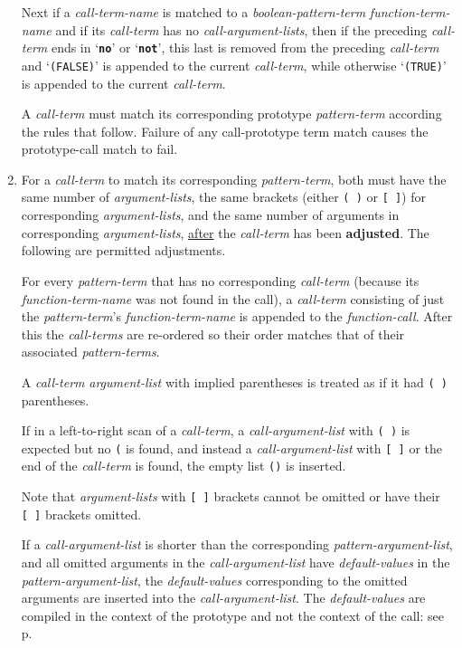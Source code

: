 \documentclass[12pt]{article}
\newcommand{\TT}[1]{{\tt \bfseries #1}}
\newcommand{\key}[1]{{\rm \bfseries #1}}
\newcommand{\pagref}[1]{p\pageref{#1}}
\begin{document}
\begin{enumerate}
Next if a {\em call-term-name} is matched to a {\em boolean-pattern-term}
{\em function-term-name} and if its {\em call-term} has no
{\em call-argument-lists}, then if the preceding {\em call-term}
ends in `\TT{no}' or `\TT{not}', this last is removed from the
preceding {\em call-term} and `{\tt (FALSE)}' is appended to the
current {\em call-term}, while otherwise `{\tt (TRUE)}' is appended to the
current {\em call-term}.

A {\em call-term}
must match its corresponding prototype {\em pattern-term} according
the rules that follow.  Failure of any call-prototype term match
causes the prototype-call match to fail.

\item\label{CALL-PROTOTYPE-CALL-TERM-ADJUSTMENT}
For a {\em call-term} to match its corresponding {\em pattern-term},
both must have the same number of {\em argument-lists}, the same
brackets (either {\tt (~)} or {\tt [~]}) for corresponding
{\em argument-lists}, and the same number of
arguments in corresponding {\em argument-lists}, \underline{after}
the {\em call-term} has been \key{adjusted}.  The following are
permitted adjustments.

For every {\em pattern-term} that has no corresponding {\em call-term}
(because its {\em function-term-name} was not found in the call),
a {\em call-term} consisting of just the {\em pattern-term}'s
{\em function-term-name} is appended to the {\em function-call}.
After this the {\em call-terms} are re-ordered so their order
matches that of their associated {\em pattern-terms}.

A {\em call-term} {\em argument-list} with implied parentheses
is treated as if it had {\tt (~)} parentheses.

If in a left-to-right scan of a {\em call-term},
a {\em call-argument-list} with {\tt (~)} is expected but no {\tt (}
is found, and instead a {\em call-argument-list} with {\tt [~]}
or the end of the {\em call-term} is found,
the empty list {\tt ()} is inserted.

Note that {\em argument-lists} with {\tt [~]} brackets cannot
be omitted or have their {\tt [~]} brackets omitted.

If a {\em call-argument-list} is shorter than the
corresponding {\em pattern-argument-list}, and all omitted
arguments in the {\em call-argument-list} have {\em default-values}
in the {\em pattern-argument-list}, the {\em default-values} corresponding
to the omitted arguments are inserted into
the {\em call-argument-list}.
The {\em default-values} are compiled in the context of the prototype
and not the context of the call: see \pagref{DEFAULT-CONTEXT}.


\end{enumerate}
\end{document}
